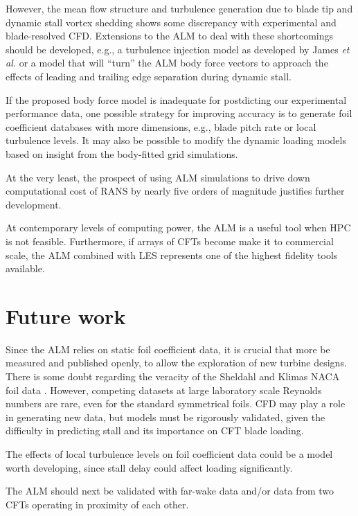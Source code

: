 However, the mean flow structure and turbulence generation due to blade tip and
dynamic stall vortex shedding shows some discrepancy with experimental and
blade-resolved CFD. Extensions to the ALM to deal with these shortcomings should
be developed, e.g., a turbulence injection model as developed by James \emph{et
    al.} \cite{James2010} or a model that will ``turn'' the ALM body force vectors
to approach the effects of leading and trailing edge separation during dynamic
stall.


If the proposed body force model is inadequate for postdicting our experimental
performance data, one possible strategy for improving accuracy is to generate
foil coefficient databases with more dimensions, e.g., blade pitch rate or local
turbulence levels. It may also be possible to modify the dynamic loading models
based on insight from the body-fitted grid simulations.

At the very least, the prospect of using ALM simulations to drive down
computational cost of RANS by nearly five orders of magnitude justifies further
development.

At contemporary levels of computing power, the ALM is a useful tool when HPC is
not feasible. Furthermore, if arrays of CFTs become make it to commercial scale,
the ALM combined with LES represents one of the highest fidelity tools
available.


\section{Future work}

Since the ALM relies on static foil coefficient data, it is crucial that more be
measured and published openly, to allow the exploration of new turbine designs.
There is some doubt regarding the veracity of the Sheldahl and Klimas NACA foil
data \cite{Bedon2014}. However, competing datasets at large laboratory scale
Reynolds numbers are rare, even for the standard symmetrical foils. CFD may play
a role in generating new data, but models must be rigorously validated, given
the difficulty in predicting stall and its importance on CFT blade loading.

The effects of local turbulence levels on foil coefficient data could be a model
worth developing, since stall delay could affect loading significantly.

The ALM should next be validated with far-wake data and/or data from two CFTs
operating in proximity of each other.

